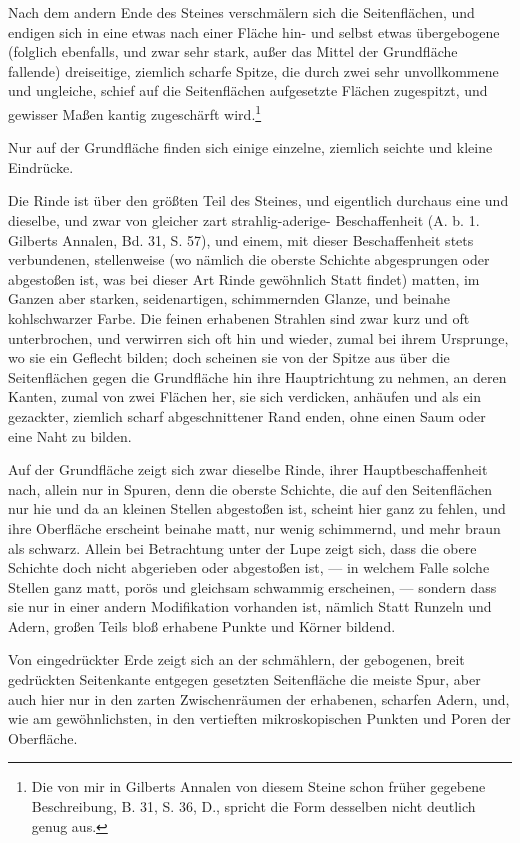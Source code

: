 \documentclass[a4paper, 11pt, oneside, german]{article}
\begin{document}
Nach dem andern Ende des Steines verschmälern sich die Seitenflächen, und endigen sich in eine etwas nach einer Fläche hin- und selbst etwas übergebogene (folglich ebenfalls, und zwar sehr stark, außer das Mittel der Grundfläche fallende) dreiseitige, ziemlich scharfe Spitze, die durch zwei sehr unvollkommene und ungleiche, schief auf die Seitenflächen aufgesetzte Flächen zugespitzt, und gewisser Maßen kantig zugeschärft wird.\footnote{Die von mir in Gilberts Annalen von diesem Steine schon früher gegebene Beschreibung, B. 31, S. 36, D., spricht die Form desselben nicht deutlich genug aus.}

Nur auf der Grundfläche finden sich einige einzelne, ziemlich seichte und kleine Eindrücke.

Die Rinde ist über den größten Teil des Steines, und eigentlich durchaus eine und dieselbe, und zwar von gleicher zart strahlig-aderige- Beschaffenheit (A. b. 1. Gilberts Annalen, Bd. 31, S. 57), und einem, mit dieser Beschaffenheit stets verbundenen, stellenweise (wo nämlich die oberste Schichte abgesprungen oder abgestoßen ist, was bei dieser Art Rinde gewöhnlich Statt findet) matten, im Ganzen aber starken, seidenartigen, schimmernden Glanze, und beinahe kohlschwarzer Farbe. Die feinen erhabenen Strahlen sind zwar kurz und oft unterbrochen, und verwirren sich oft hin und wieder, zumal bei ihrem Ursprunge, wo sie ein Geflecht bilden; doch scheinen sie von der Spitze aus über die Seitenflächen gegen die Grundfläche hin ihre Hauptrichtung zu nehmen, an deren Kanten, zumal von zwei Flächen her, sie sich verdicken, anhäufen und als ein gezackter, ziemlich scharf abgeschnittener Rand enden, ohne einen Saum oder eine Naht zu bilden.

Auf der Grundfläche zeigt sich zwar dieselbe Rinde, ihrer Hauptbeschaffenheit nach, allein nur in Spuren, denn die oberste Schichte, die auf den Seitenflächen nur hie und da an kleinen Stellen abgestoßen ist, scheint hier ganz zu fehlen, und ihre Oberfläche erscheint beinahe matt, nur wenig schimmernd, und mehr braun als schwarz. Allein bei Betrachtung unter der Lupe zeigt sich, dass die obere Schichte doch nicht abgerieben oder abgestoßen ist, --- in welchem Falle solche Stellen ganz matt, porös und gleichsam schwammig erscheinen, --- sondern dass sie nur in einer andern Modifikation vorhanden ist, nämlich Statt Runzeln und Adern, großen Teils bloß erhabene Punkte und Körner bildend.

Von eingedrückter Erde zeigt sich an der schmählern, der gebogenen, breit gedrückten Seitenkante entgegen gesetzten Seitenfläche die meiste Spur, aber auch hier nur in den zarten Zwischenräumen der erhabenen, scharfen Adern, und, wie am gewöhnlichsten, in den vertieften mikroskopischen Punkten und Poren der Oberfläche.
\end{document}
